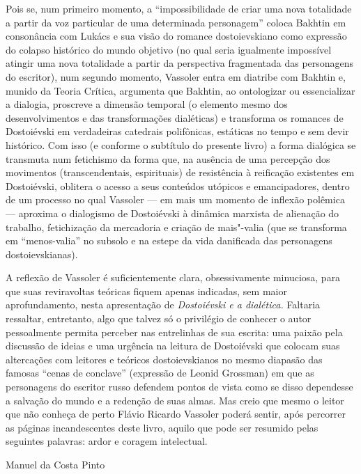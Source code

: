Pois se, num primeiro momento, a ``impossibilidade de criar uma nova
totalidade a partir da voz particular de uma determinada personagem''
coloca Bakhtin em consonância com Lukács e sua visão do romance
dostoievskiano como expressão do colapso histórico do mundo objetivo (no
qual seria igualmente impossível atingir uma nova totalidade a partir da
perspectiva fragmentada das personagens do escritor), num segundo
momento, Vassoler entra em diatribe com Bakhtin e, munido da Teoria
Crítica, argumenta que Bakhtin, ao ontologizar ou essencializar a
dialogia, proscreve a dimensão temporal (o elemento mesmo dos
desenvolvimentos e das transformações dialéticas) e transforma os
romances de Dostoiévski em verdadeiras catedrais polifônicas, estáticas
no tempo e sem devir histórico. Com isso (e conforme o subtítulo do
presente livro) a forma dialógica se transmuta num fetichismo da forma
que, na ausência de uma percepção dos movimentos (transcendentais,
espirituais) de resistência à reificação existentes em Dostoiévski,
oblitera o acesso a seus conteúdos utópicos e emancipadores, dentro de
um processo no qual Vassoler --- em mais um momento de inflexão polêmica
--- aproxima o dialogismo de Dostoiévski à dinâmica marxista de alienação
do trabalho, fetichização da mercadoria e criação de mais"-valia (que se
transforma em ``menos-valia'' no subsolo e na estepe da vida danificada
das personagens dostoievskianas).

A reflexão de Vassoler é suficientemente clara, obsessivamente
minuciosa, para que suas reviravoltas teóricas fiquem apenas indicadas,
sem maior aprofundamento, nesta apresentação de \emph{Dostoiévski e a
dialética.} Faltaria ressaltar, entretanto, algo que talvez só o
privilégio de conhecer o autor pessoalmente permita perceber nas
entrelinhas de sua escrita: uma paixão pela discussão de ideias e uma
urgência na leitura de Dostoiévski que colocam suas altercações com
leitores e teóricos dostoievskianos no mesmo diapasão das famosas
``cenas de conclave'' (expressão de Leonid Grossman) em que as
personagens do escritor russo defendem pontos de vista como se disso
dependesse a salvação do mundo e a redenção de suas almas. Mas creio que
mesmo o leitor que não conheça de perto Flávio Ricardo Vassoler poderá
sentir, após percorrer as páginas incandescentes deste livro, aquilo que
pode ser resumido pelas seguintes palavras: ardor e coragem intelectual.

\begin{flushright}
Manuel da Costa Pinto
\end{flushright}
